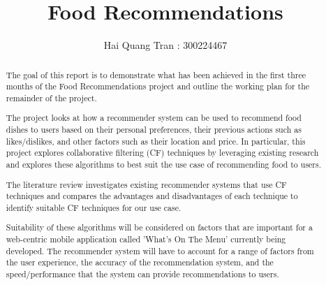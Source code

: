 \documentclass[11pt
              , a4paper
              , twoside
              , openright
              ]{report}
\title{Food Recommendations}
\author{Hai Quang Tran : 300224467}
\date{}
\begin{document}
\frontmatter



\begin{abstract}

The goal of this report is to demonstrate what has been achieved in the first three months of the Food Recommendations project and outline the working plan for the remainder of the project. 

The project looks at how a recommender system can be used to recommend food dishes to users based on their personal preferences, their previous actions such as likes/dislikes, and other factors such as their location and price. In particular, this project explores collaborative filtering (CF) techniques by leveraging existing research and explores these algorithms to best suit the use case of recommending food to users. 

The literature review investigates existing recommender systems that use CF techniques and compares the advantages and disadvantages of each technique to identify suitable CF techniques for our use case. 

Suitability of these algorithms will be considered on factors that are important for a web-centric mobile application called 'What's On The Menu' currently being developed. The recommender system will have to account for a range of factors from the user experience, the accuracy of the recommendation system, and the speed/performance that the system can provide recommendations to users.


\end{abstract}


\maketitle

% 

\tableofcontents
\end{document}
